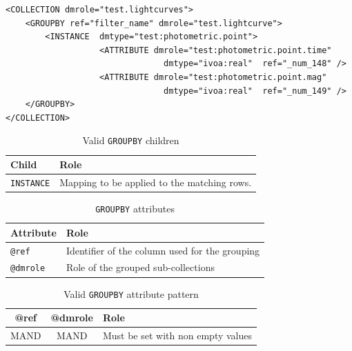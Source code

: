 \documentclass[11pt,a4paper]{ivoa}
\begin{document}
\begin{lstlisting}[caption={GROUPBY examples},style=XML]
<COLLECTION dmrole="test.lightcurves">
    <GROUPBY ref="filter_name" dmrole="test.lightcurve">
        <INSTANCE  dmtype="test:photometric.point">
                   <ATTRIBUTE dmrole="test:photometric.point.time" 
                                dmtype="ivoa:real"  ref="_num_148" />
                   <ATTRIBUTE dmrole="test:photometric.point.mag" 
                                dmtype="ivoa:real"  ref="_num_149" />
    </GROUPBY>
</COLLECTION>
\end{lstlisting}

\begin{table}[hbtp]
\small
\centering
\begin{tabulary}{\linewidth}{|L|J|}
\hline
    \textbf{Child} &
    \textbf{Role} \\
\hline \hline
     \texttt{INSTANCE}    &
     Mapping to be applied to the matching rows.  \\       
\hline
\end{tabulary}
     \caption{Valid  \texttt{GROUPBY} children} 
     \label{tbl:group-children}
\end{table}

\begin{table}[!htbp]
\small
\centering
\begin{tabulary}{\linewidth}{|L|J|}
       \hline
           \textbf{Attribute} &  
           \textbf{Role} \\
       \hline  \hline
           \texttt{@ref}    & 
           Identifier of the column used for the grouping \\       
        \hline 
           \texttt{@dmrole}    & 
           Role of the grouped sub-collections\\       
        \hline 
\end{tabulary}
\caption{\texttt{GROUPBY} attributes} 
\label{tbl:group-att}
\end{table}

\begin{table}[!htbp]
\small
\centering
\begin{tabulary}{\linewidth}{|C|C|J|}
       \hline
           \textbf{@ref} & 
           \textbf{@dmrole} &  
           \textbf{Role} \\
        \hline   \hline
           MAND    &                       
           MAND    &            
           Must be set with non empty values \\       
       \hline 
\end{tabulary}
\caption{Valid \texttt{GROUPBY} attribute pattern} 
\label{tbl:group-patterns}
\end{table}
\FloatBarrier
\end{document}
